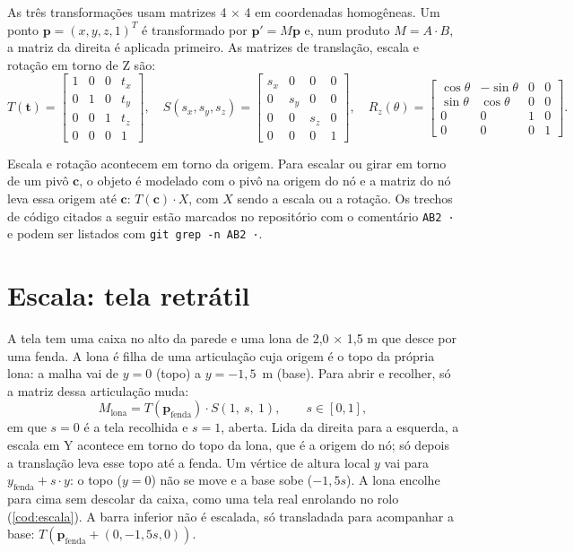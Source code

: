 \documentclass[
  12pt,          %
  oneside,       %
  a4paper,       %
  chapter=TITLE, %
  english,
  brazil,        %
]{abntex2}
\begin{document}
As três transformações usam matrizes 4 × 4 em coordenadas homogêneas. Um ponto
$\mathbf{p} = (x, y, z, 1)^T$ é transformado por $\mathbf{p}' = M\mathbf{p}$ e, num produto $M = A \cdot B$,
a matriz da direita é aplicada primeiro. As matrizes de translação, escala e rotação em torno de Z são:
\begin{equation}
  T(\mathbf{t}) =
  \begin{bmatrix} 1 & 0 & 0 & t_x \\ 0 & 1 & 0 & t_y \\ 0 & 0 & 1 & t_z \\ 0 & 0 & 0 & 1 \end{bmatrix},\quad
  S(s_x, s_y, s_z) =
  \begin{bmatrix} s_x & 0 & 0 & 0 \\ 0 & s_y & 0 & 0 \\ 0 & 0 & s_z & 0 \\ 0 & 0 & 0 & 1 \end{bmatrix},\quad
  R_z(\theta) =
  \begin{bmatrix} \cos\theta & -\sin\theta & 0 & 0 \\ \sin\theta & \cos\theta & 0 & 0 \\ 0 & 0 & 1 & 0 \\ 0 & 0 & 0 & 1 \end{bmatrix}.
\end{equation}

Escala e rotação acontecem em torno da origem. Para escalar ou girar em torno de um pivô $\mathbf{c}$, o
objeto é modelado com o pivô na origem do nó e a matriz do nó leva essa origem até $\mathbf{c}$:
$T(\mathbf{c}) \cdot X$, com $X$ sendo a escala ou a rotação. Os trechos de código citados a seguir estão
marcados no repositório com o comentário \texttt{AB2~·} e podem ser listados com
\texttt{git grep -n \textquotedbl{}AB2~·\textquotedbl}.

\section{Escala: tela retrátil}

A tela tem uma caixa no alto da parede e uma lona de 2,0 × 1,5 m que desce por uma fenda. A lona é filha de
uma articulação cuja origem é o topo da própria lona: a malha vai de $y = 0$ (topo) a $y = -1{,}5$~m (base).
Para abrir e recolher, só a matriz dessa articulação muda:
\begin{equation}
  M_{\text{lona}} = T(\mathbf{p}_{\text{fenda}}) \cdot S(1,\ s,\ 1), \qquad s \in [0, 1],
  \label{eq:escala}
\end{equation}
em que $s = 0$ é a tela recolhida e $s = 1$, aberta. Lida da direita para a esquerda, a escala em Y acontece em
torno do topo da lona, que é a origem do nó; só depois a translação leva esse topo até a fenda. Um vértice
de altura local $y$ vai para $y_{\text{fenda}} + s \cdot y$: o topo ($y = 0$) não se move e a base sobe
($-1{,}5 s$). A lona encolhe para cima sem descolar da caixa, como uma tela real enrolando no rolo
(\autoref{cod:escala}). A barra inferior não é escalada, só transladada para acompanhar a base:
$T(\mathbf{p}_{\text{fenda}} + (0, -1{,}5 s, 0))$.
\end{document}
